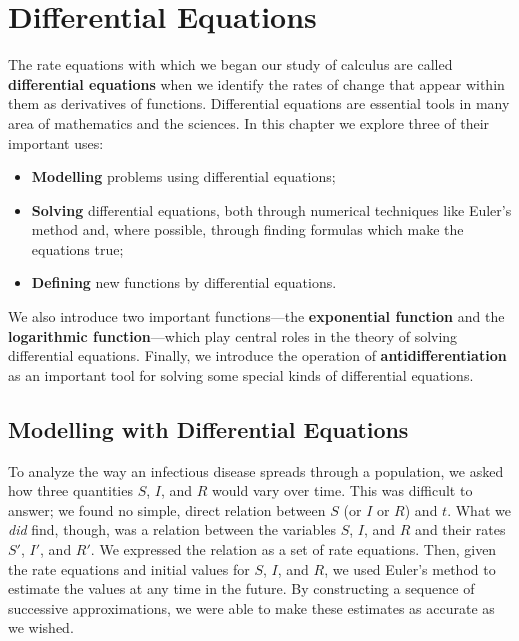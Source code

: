 

\chapter{Differential Equations}
\label{chap:differential-equations}


The rate equations with which we began our study of calculus are
called {\bf differential equations} when
we identify the rates of change that appear within them as derivatives
of functions.  Differential equations are essential tools in many area
of mathematics and the sciences.  In this chapter we explore three of
their important uses:
\begin{itemize}

\item {\bf Modelling} problems using differential equations;

\item {\bf Solving} differential equations, both through numerical
  techniques like Euler's method and, where possible, through finding
  formulas which make the equations true;

\item {\bf Defining} new functions by differential equations.

\end{itemize}
We also introduce two important functions---the {\bf exponential
  function} and the {\bf logarithmic function}---which play central
roles in the theory of solving differential equations.  Finally, we
introduce the operation of {\bf antidifferentiation} as an important
tool for solving some special kinds of differential equations.

\section{Modelling with Differential Equations}
\label{sec:modelling-with-differential-equations}

To analyze the way an infectious disease spreads through a population,
we asked how three quantities $S$, $I$, and $R$ would vary over time.
This was difficult to answer; we found no simple, direct relation
between $S$ (or $I$ or $R$) and $t$.  What we {\em did\/} find,
though, was a relation between the variables $S$, $I$, and $R$ and
their rates $S'$, $I'$, and $R'$.  We expressed the relation as a set
of rate equations.  Then, given the rate equations and initial values
for $S$, $I$, and $R$, we used Euler's method to estimate the values
at any time in the future.  By constructing a sequence of successive
approximations, we were able to make these estimates as accurate as we
wished.

